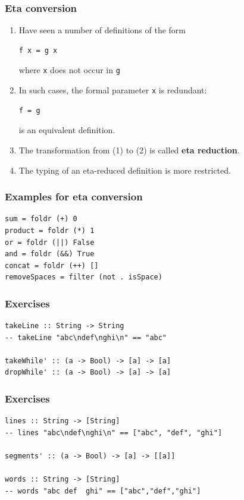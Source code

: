 \documentclass{beamer}
\begin{document}
\begin{frame}[fragile]
  \frametitle{Eta conversion}
  \begin{enumerate}
  \item Have seen a number of definitions of the form
\begin{verbatim}
f x = g x
\end{verbatim}
    where \texttt{x} does not occur in \texttt{g}
  \item 
    In such cases, the formal parameter \texttt{x} is redundant:
\begin{verbatim}
f = g
\end{verbatim}
    is an equivalent definition.
  \item The transformation from (1) to (2) is called \textbf{eta reduction}.
  \item The typing of an eta-reduced definition is more restricted.
\end{enumerate}
\end{frame}
\begin{frame}[fragile]
  \frametitle{Examples for eta conversion}
\begin{verbatim}
sum = foldr (+) 0
product = foldr (*) 1
or = foldr (||) False
and = foldr (&&) True
concat = foldr (++) []
removeSpaces = filter (not . isSpace)
\end{verbatim}
\end{frame}
\begin{frame}[fragile]
  \frametitle{Exercises}
\begin{verbatim}
takeLine :: String -> String
-- takeLine "abc\ndef\nghi\n" == "abc"

takeWhile' :: (a -> Bool) -> [a] -> [a]
dropWhile' :: (a -> Bool) -> [a] -> [a]
\end{verbatim}
\end{frame}
\begin{frame}[fragile]
  \frametitle{Exercises}
\begin{verbatim}
lines :: String -> [String]
-- lines "abc\ndef\nghi\n" == ["abc", "def", "ghi"]

segments' :: (a -> Bool) -> [a] -> [[a]]

words :: String -> [String]
-- words "abc def  ghi" == ["abc","def","ghi"]
\end{verbatim}
\end{frame}
\end{document}
